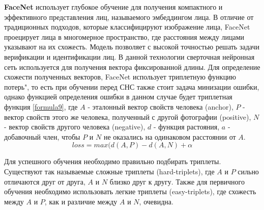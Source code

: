 \textbf{FaceNet} использует глубокое обучение для получения компактного и эффективного представления лиц, называемого эмбеддингом лица. В отличие от традиционных подходов, которые классифицируют изображение лица, FaceNet проецирует лица в многомерное пространство, где расстояния между лицами указывают на их схожесть. Модель позволяет с высокой точностью решать задачи верификации и идентификации лиц. В данной технологии сверточная нейронная сеть используется для получения вектора фиксированной длины. Для определение схожести полученных векторов, FaceNet использует триплетную функцию потерь", то есть при обучении перед СНС также стоит задача минизации ошибки, однако функцией определения ошибки в данном случае будет триплетная функция \ref{formula9}, где $A$ - эталонный вектор свойств человека (anchor), $P$ - вектор свойств этого же человека, полученный с другой фотографии (positive), $N$ - вектор свойств другого человека (negative), $d$ - функция растояния, $a$ - добавочный член, чтобы $P$ и $N$ не оказались на одинаковом расстоянии от $A$.
\begin{equation}
loss = max(d(A, P) - d(A, N) + \alpha
\label{formula9}
\end{equation}

Для успешного обучения необходимо правильно подбирать триплеты. Существуют так называемые сложные триплеты (hard-triplets), где $A$ и $P$ сильно отличаются друг от друга, $A$ и $N$ близко друг к другу. Также для первичного обучения необходимо использовать легкие триплеты (easy-triplets), где схожесть между $A$ и $P$, как и различие между $A$ и $N$, очевидна.



\renewcommand\bibname{СПИСОК ИСПОЛЬЗОВАННЫХ ИСТОЧНИКОВ}





